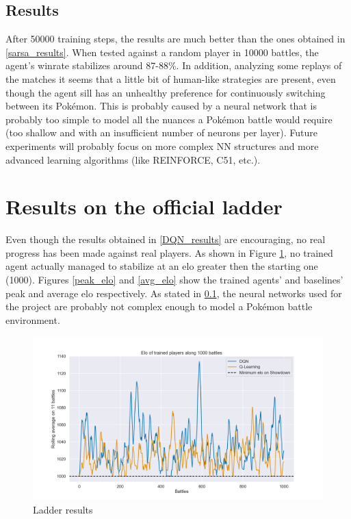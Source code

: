 \documentclass{article}
\begin{document}
\subsection{Results} \label{NN_complexity}

After 50000 training steps, the results are much better than the ones obtained in \ref{sarsa_results}.
When tested against a random player in 10000 battles, the agent's winrate stabilizes around 87-88\%.
In addition, analyzing some replays of the matches it seems that a little bit of human-like strategies are present, even though the agent sill has an unhealthy preference for continuously switching between its Pokémon.
This is probably caused by a neural network that is probably too simple to model all the nuances a Pokémon battle would require (too shallow and with an insufficient number of neurons per layer).
Future experiments will probably focus on more complex NN structures and more advanced learning algorithms (like REINFORCE, C51, etc.).


\section{Results on the official ladder}

Even though the results obtained in \ref{DQN_results} are encouraging, no real progress has been made against real players.
As shown in Figure \ref{ladder_results}, no trained agent actually managed to stabilize at an elo greater then the starting one (1000).
Figures \ref{peak_elo} and \ref{avg_elo} show the trained agents' and baselines' peak and average elo respectively.
As stated in \ref{NN_complexity}, the neural networks used for the project are probably not complex enough to model a Pokémon battle environment.

\begin{figure}
    \centering
    \includegraphics[width=\textwidth]{img/rank.png}
    \caption{Ladder results}
    \label{ladder_results}
\end{figure}
\end{document}
